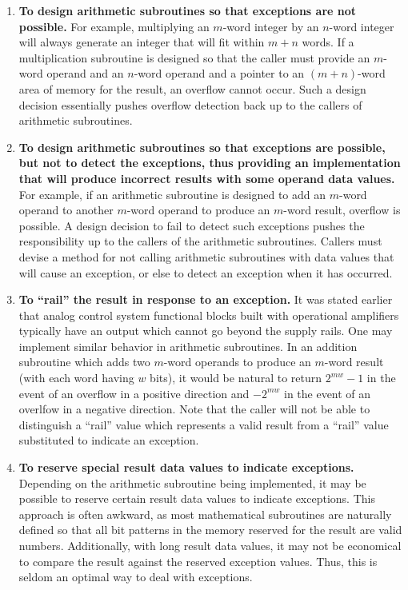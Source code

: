 \begin{enumerate}
\item \label{enum:ccil0:spdi0:soud0:01:01}
      \textbf{To design arithmetic subroutines so that exceptions are not
      possible.}  
      For example, multiplying an $m$-word integer by an $n$-word integer
      will always generate an integer that will fit within $m+n$ words.
      If a multiplication subroutine is designed so that the caller must
      provide an $m$-word operand and an $n$-word operand and a pointer to
      an $(m+n)$-word area of memory for the result, an overflow cannot occur.
      Such a design decision essentially pushes overflow detection back up to
      the callers of arithmetic subroutines.
\item \label{enum:ccil0:spdi0:soud0:01:02}
      \textbf{To design arithmetic subroutines so that exceptions are possible,
      but not to detect the exceptions, thus providing an implementation that
      will produce incorrect results with some operand data values.}
      For example, if an arithmetic subroutine is designed to add an $m$-word
      operand to another $m$-word operand to produce an $m$-word result, overflow
      is possible.  A design decision to fail to detect such exceptions pushes
      the responsibility up to the callers of the arithmetic subroutines.
      Callers must devise a method for not calling arithmetic subroutines
      with data values that will cause an exception, or else to detect an exception
      when it has occurred.
\item \label{enum:ccil0:spdi0:soud0:01:03}
      \textbf{To ``rail'' the result in response to an exception.}  
      It was stated earlier that analog control system functional blocks
      built with operational 
      amplifiers typically have an output which cannot go beyond the 
      supply rails.  One may implement similar behavior in arithmetic subroutines.
      In an addition subroutine which adds two $m$-word operands to produce an
      $m$-word result (with each word having $w$ bits), it would be natural to 
      return $2^{mw}-1$ in the event of an overflow in a positive direction and 
      $-2^{mw}$ in the event of an overlfow in a negative direction.  Note that
      the caller will not be able to distinguish a ``rail'' value which represents
      a valid result from a ``rail'' value substituted to indicate an exception.
\item \label{enum:ccil0:spdi0:soud0:01:04}
      \textbf{To reserve special result data values to indicate exceptions.}
      Depending on the arithmetic subroutine being implemented, it may be possible
      to reserve certain result data values to indicate exceptions.  This approach
      is often awkward, as most mathematical subroutines are naturally defined so that
      all bit patterns in the memory reserved for the result are valid numbers.
      Additionally, with long result data values, it may not be economical to
      compare the result against the reserved exception values.  Thus, this is seldom
      an optimal way to deal with exceptions.


\end{enumerate}
